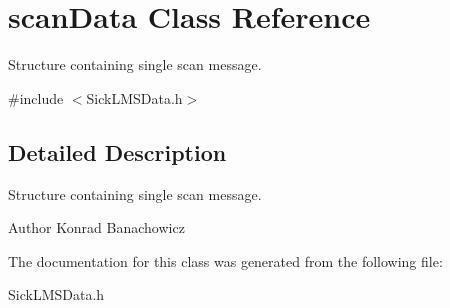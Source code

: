 \hypertarget{classscanData}{\section{scan\-Data Class Reference}
\label{classscanData}
}


Structure containing single scan message.  




{\ttfamily \#include $<$Sick\-L\-M\-S\-Data.\-h$>$}



\subsection{Detailed Description}
Structure containing single scan message. 

\begin{DoxyAuthor}{Author}
Konrad Banachowicz 
\end{DoxyAuthor}


The documentation for this class was generated from the following file\-:\begin{DoxyCompactItemize}
\item 
Sick\-L\-M\-S\-Data.\-h\end{DoxyCompactItemize}
